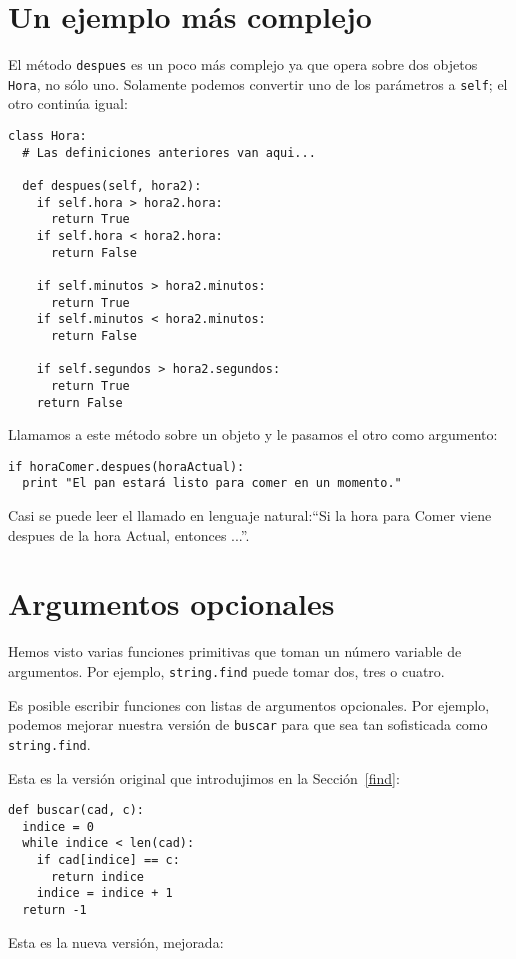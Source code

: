\section{Un ejemplo más complejo}

El método \texttt{despues} es un poco más complejo ya que opera sobre
dos objetos  \texttt{Hora}, no sólo uno.  Solamente podemos convertir
uno de los parámetros a  \texttt{self}; el otro continúa igual:

\beforeverb
\begin{verbatim}
class Hora:
  # Las definiciones anteriores van aqui...

  def despues(self, hora2):
    if self.hora > hora2.hora:
      return True
    if self.hora < hora2.hora:
      return False

    if self.minutos > hora2.minutos:
      return True
    if self.minutos < hora2.minutos:
      return False

    if self.segundos > hora2.segundos:
      return True
    return False
\end{verbatim}
\afterverb
%
Llamamos a este método sobre un objeto y le pasamos el otro como
argumento:

\beforeverb
\begin{verbatim}
if horaComer.despues(horaActual):
  print "El pan estará listo para comer en un momento."
\end{verbatim}
\afterverb
%
Casi se puede leer el llamado en lenguaje natural:``Si la hora para Comer
viene despues de la hora Actual, entonces ...''.


\section{Argumentos opcionales}

Hemos visto varias funciones primitivas que toman un número variable
de argumentos. Por ejemplo, \texttt{string.find} puede tomar dos, tres o
cuatro.

Es posible escribir funciones con listas de argumentos opcionales. Por
ejemplo, podemos mejorar nuestra versión de  \texttt{buscar} para
que sea tan sofisticada como \texttt{string.find}.

Esta es la versión original que introdujimos en la  Sección~\ref{find}:

\beforeverb
\begin{verbatim}
def buscar(cad, c):
  indice = 0
  while indice < len(cad):
    if cad[indice] == c:
      return indice
    indice = indice + 1
  return -1
\end{verbatim}
\afterverb
%
Esta es la nueva versión, mejorada:

